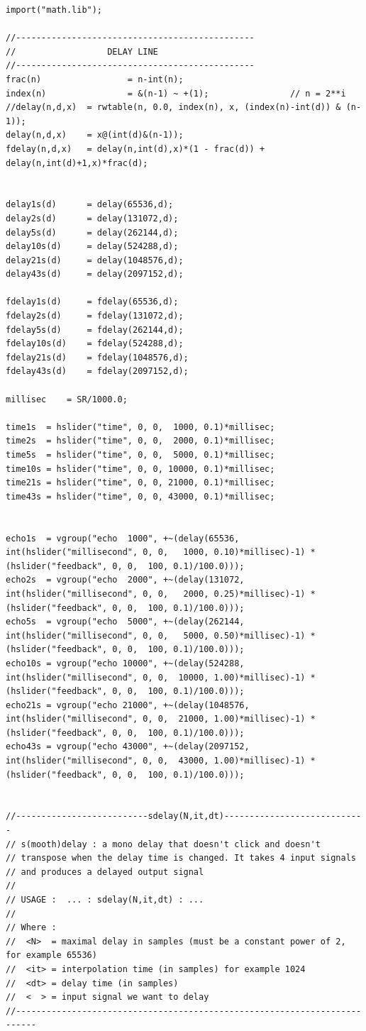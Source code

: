 \documentclass{article}
\begin{document}
\begin{lstlisting}[caption=\texttt{music.lib}]
import("math.lib");

//-----------------------------------------------
// 					DELAY LINE
//-----------------------------------------------
frac(n)                 = n-int(n);
index(n)                = &(n-1) ~ +(1);                // n = 2**i
//delay(n,d,x)  = rwtable(n, 0.0, index(n), x, (index(n)-int(d)) & (n-1));
delay(n,d,x)    = x@(int(d)&(n-1));
fdelay(n,d,x)   = delay(n,int(d),x)*(1 - frac(d)) + delay(n,int(d)+1,x)*frac(d);


delay1s(d)		= delay(65536,d);
delay2s(d)		= delay(131072,d);
delay5s(d)		= delay(262144,d);
delay10s(d)		= delay(524288,d);
delay21s(d)		= delay(1048576,d);
delay43s(d)		= delay(2097152,d);

fdelay1s(d)		= fdelay(65536,d);
fdelay2s(d)		= fdelay(131072,d);
fdelay5s(d)		= fdelay(262144,d);
fdelay10s(d)	= fdelay(524288,d);
fdelay21s(d)	= fdelay(1048576,d);
fdelay43s(d)	= fdelay(2097152,d);

millisec	= SR/1000.0;

time1s 	= hslider("time", 0, 0,  1000, 0.1)*millisec;
time2s 	= hslider("time", 0, 0,  2000, 0.1)*millisec;
time5s 	= hslider("time", 0, 0,  5000, 0.1)*millisec;
time10s = hslider("time", 0, 0, 10000, 0.1)*millisec;
time21s = hslider("time", 0, 0, 21000, 0.1)*millisec;
time43s = hslider("time", 0, 0, 43000, 0.1)*millisec;


echo1s  = vgroup("echo  1000", +~(delay(65536,   int(hslider("millisecond", 0, 0,	1000, 0.10)*millisec)-1) * (hslider("feedback", 0, 0,  100, 0.1)/100.0)));
echo2s  = vgroup("echo  2000", +~(delay(131072,  int(hslider("millisecond", 0, 0,	2000, 0.25)*millisec)-1) * (hslider("feedback", 0, 0,  100, 0.1)/100.0)));
echo5s  = vgroup("echo  5000", +~(delay(262144,  int(hslider("millisecond", 0, 0,	5000, 0.50)*millisec)-1) * (hslider("feedback", 0, 0,  100, 0.1)/100.0)));
echo10s = vgroup("echo 10000", +~(delay(524288,  int(hslider("millisecond", 0, 0,  10000, 1.00)*millisec)-1) * (hslider("feedback", 0, 0,  100, 0.1)/100.0)));
echo21s = vgroup("echo 21000", +~(delay(1048576, int(hslider("millisecond", 0, 0,  21000, 1.00)*millisec)-1) * (hslider("feedback", 0, 0,  100, 0.1)/100.0)));
echo43s = vgroup("echo 43000", +~(delay(2097152, int(hslider("millisecond", 0, 0,  43000, 1.00)*millisec)-1) * (hslider("feedback", 0, 0,  100, 0.1)/100.0)));


//--------------------------sdelay(N,it,dt)----------------------------
// s(mooth)delay : a mono delay that doesn't click and doesn't 
// transpose when the delay time is changed. It takes 4 input signals 
// and produces a delayed output signal
//
// USAGE : 	... : sdelay(N,it,dt) : ...
//
// Where :
//	<N>  = maximal delay in samples (must be a constant power of 2, for example 65536)
//	<it> = interpolation time (in samples) for example 1024
//	<dt> = delay time (in samples)
//  <  > = input signal we want to delay
//--------------------------------------------------------------------------


\end{lstlisting}
\end{document}

